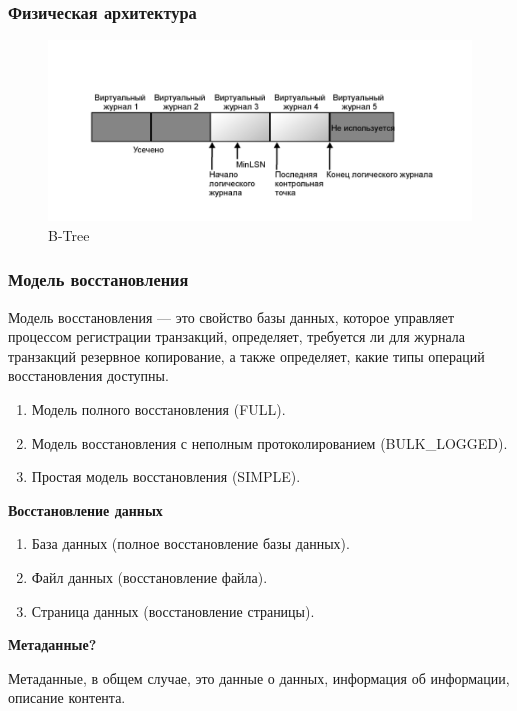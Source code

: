 \subsubsection{Физическая архитектура}

\begin{figure}[ht!]
	\centering
	\includegraphics[width=18cm, keepaspectratio]{assets/physics.png}
	\caption{B-Tree} 
\end{figure}
\FloatBarrier

\subsubsection{Модель восстановления}

Модель восстановления --- это свойство базы данных, которое управляет процессом регистрации транзакций, определяет, требуется ли для журнала транзакций резервное копирование, а также определяет, какие типы операций восстановления доступны.

\begin{enumerate}
	\item Модель полного восстановления (FULL).
	\item Модель восстановления с неполным протоколированием (BULK\_LOGGED).
	\item Простая модель восстановления (SIMPLE).
\end{enumerate}

\textbf{Восстановление данных}

\begin{enumerate}
	\item База данных (полное восстановление базы данных).
	\item Файл данных (восстановление файла).
	\item Страница данных (восстановление страницы).
\end{enumerate}

\textbf{Метаданные?}

Метаданные, в общем случае, это данные о данных, информация об информации, описание контента.

